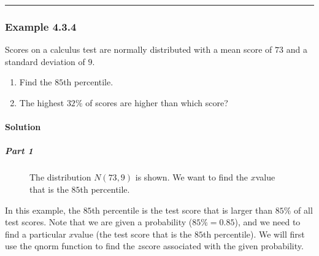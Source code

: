 \documentclass[letterpaper,10pt,english]{jupyterBook}
\begin{document}
\bigskip\hrule\bigskip



\subsubsection{Example 4.3.4}
\label{\detokenize{Ch4 The Normal Distribution and the Central Limit Theorem/4.3 The Normal Distribution and z-scores:example-4-3-4}}
\sphinxAtStartPar
Scores on a calculus test are normally distributed with a mean score of \(73\) and a standard deviation of \(9\).
\begin{enumerate}
%
\item {} 
\sphinxAtStartPar
Find the \(85\)th percentile.

\item {} 
\sphinxAtStartPar
The highest \(32\%\) of scores are higher than which score?

\end{enumerate}


\paragraph{Solution}
\label{\detokenize{Ch4 The Normal Distribution and the Central Limit Theorem/4.3 The Normal Distribution and z-scores:id8}}

\subparagraph{Part 1}
\label{\detokenize{Ch4 The Normal Distribution and the Central Limit Theorem/4.3 The Normal Distribution and z-scores:id9}}
\begin{figure}[htbp]
\centering
\capstart

\noindent{}
\caption{The distribution \(N(73, 9)\) is shown. We want to find the \(x\)\sphinxhyphen{}value that is the \(85\)th percentile.}\label{\detokenize{Ch4 The Normal Distribution and the Central Limit Theorem/4.3 The Normal Distribution and z-scores:normal-ex4}}\end{figure}

\sphinxAtStartPar
In this example, the \(85\)th percentile is the test score that is larger than \(85\%\) of all test scores. Note that we are given a probability (\(85\% = 0.85\)), and we need to find a particular \(x\)\sphinxhyphen{}value (the test score that is the \(85\)th percentile). We will first use the qnorm function to find the \(z\)\sphinxhyphen{}score associated with the given probability.
\end{document}
